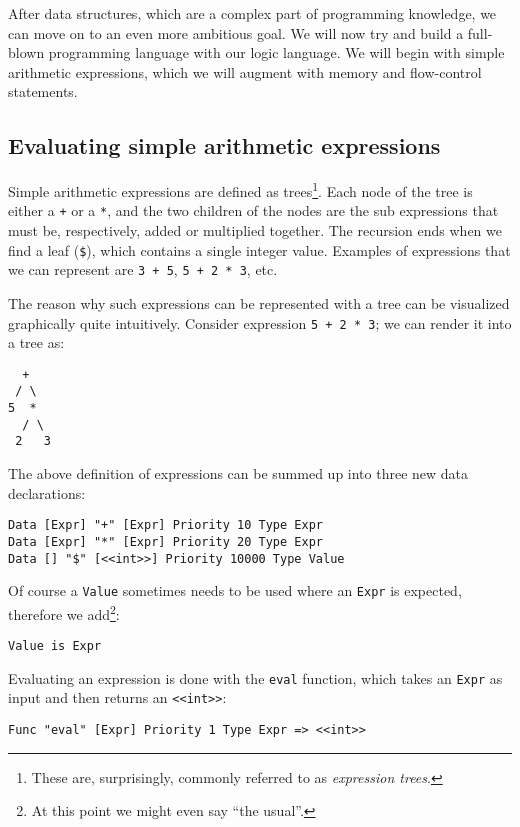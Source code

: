 After data structures, which are a complex part of programming knowledge, we can move on to an even more ambitious goal. We will now try and build a full-blown programming language with our logic language. We will begin with simple arithmetic expressions, which we will augment with memory and flow-control statements.

\subsection{Evaluating simple arithmetic expressions}
Simple arithmetic expressions are defined as trees\footnote{These are, surprisingly, commonly referred to as \textit{expression trees}.}. Each node of the tree is either a \texttt{+} or a \texttt{*}, and the two children of the nodes are the sub expressions that must be, respectively, added or multiplied together. The recursion ends when we find a leaf (\texttt{\$}), which contains a single integer value. Examples of expressions that we can represent are \texttt{3 + 5}, \texttt{5 + 2 * 3}, etc.

The reason why such expressions can be represented with a tree can be visualized graphically quite intuitively. Consider expression \texttt{5 + 2 * 3}; we can render it into a tree as:

\begin{lstlisting}
  +
 / \
5  *
  / \
 2   3
\end{lstlisting}

The above definition of expressions can be summed up into three new data declarations:

\begin{lstlisting}
Data [Expr] "+" [Expr] Priority 10 Type Expr
Data [Expr] "*" [Expr] Priority 20 Type Expr
Data [] "$" [<<int>>] Priority 10000 Type Value
\end{lstlisting}

Of course a \texttt{Value} sometimes needs to be used where an \texttt{Expr} is expected, therefore we add\footnote{At this point we might even say ``the usual''.}:

\begin{lstlisting}
Value is Expr
\end{lstlisting}

Evaluating an expression is done with the \texttt{eval} function, which takes an \texttt{Expr} as input and then returns an \texttt{<<int>>}:

\begin{lstlisting}
Func "eval" [Expr] Priority 1 Type Expr => <<int>>
\end{lstlisting}

